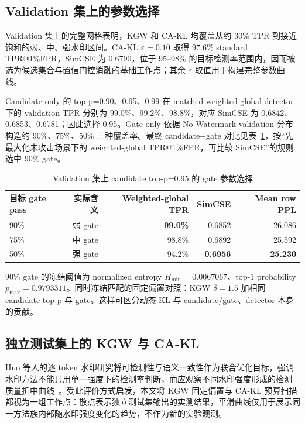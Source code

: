 \documentclass[a4paper,UTF8,zihao=5]{ctexart}
\makeatletter
\newcommand{\cakl}{CA-KL}
\newcommand{\tpr}{TPR@1\%FPR}
\makeatother
\begin{document}
\subsection{Validation 集上的参数选择}

Validation 集上的完整网格表明，KGW 和 \cakl{} 均覆盖从约 30\% TPR 到接近饱和的弱、中、强水印区间。\cakl{} $\varepsilon=0.10$ 取得 97.6\% standard \tpr{}，SimCSE 为 0.6790，位于 95--98\% 的目标检测率范围内，因而被选为候选集合与置信门控消融的基础工作点；其余 $\varepsilon$ 取值用于构建完整参数曲线。

Candidate-only 的 top-p=0.90、0.95、0.99 在 matched weighted-global detector 下的 validation TPR 分别为 99.0\%、99.2\%、98.8\%，对应 SimCSE 为 0.6842、0.6853、0.6781；因此选择 0.95。Gate-only 依据 No-Watermark validation 分布构造约 90\%、75\%、50\% 三种覆盖率。最终 candidate+gate 对比见表~\ref{tab:gate-selection}，按“先最大化未攻击场景下的 weighted-global \tpr{}，再比较 SimCSE”的规则选中 90\% gate。

\begin{table}[H]
    \centering
    \caption{Validation 集上 candidate top-p=0.95 的 gate 参数选择}
    \label{tab:gate-selection}
    \small
    \begin{tabular}{lrrrr}
        \toprule
        目标 gate pass & 实际含义   & Weighted-global TPR & SimCSE          & Mean row PPL    \\
        \midrule
        90\%         & 弱 gate & \textbf{99.0\%}     & 0.6852          & 26.086          \\
        75\%         & 中 gate & 98.8\%              & 0.6892          & 25.592          \\
        50\%         & 强 gate & 94.2\%              & \textbf{0.6956} & \textbf{25.230} \\
        \bottomrule
    \end{tabular}
\end{table}

90\% gate 的冻结阈值为 normalized entropy $H_{\min}=0.0067067$、top-1 probability $p_{\max}=0.9793311$。同时冻结匹配的固定偏置对照：KGW $\delta=1.5$ 加相同 candidate top-p 与 gate。这样可区分动态 KL 与 candidate/gate、detector 本身的贡献。

\subsection{独立测试集上的 KGW 与 CA-KL}

Huo 等人的逐 token 水印研究将可检测性与语义一致性作为联合优化目标，强调水印方法不能只用单一强度下的检测率判断，而应观察不同水印强度形成的检测--质量折中曲线~\cite{huo2024token}。受此评价方式启发，本文将 KGW 固定偏置与 \cakl{} 预算扫描都视为一组工作点：散点表示独立测试集输出的实测结果，平滑曲线仅用于展示同一方法族内部随水印强度变化的趋势，不作为新的实验观测。
\end{document}

